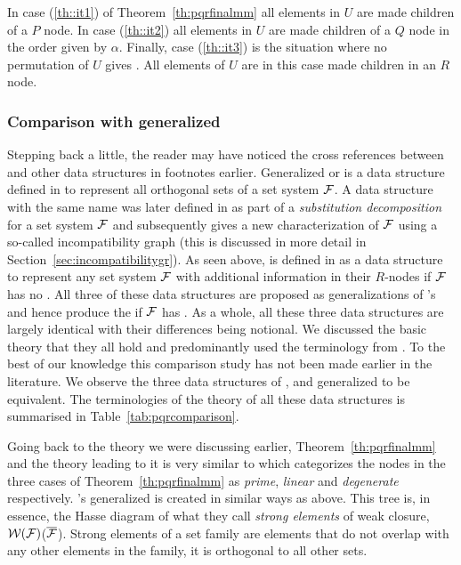In case (\ref{th::it1}) of Theorem~\ref{th:pqrfinalmm} all elements in
$U$ are made children of a $P$ node. In case (\ref{th::it2}) all
elements in $U$ are made children of a $Q$ node in the order given by
$\alpha$. Finally, case (\ref{th::it3}) is the situation where no permutation
of $U$ gives \COP. All elements of $U$ are in this case made children
in an $R$ node.

\subsubsection{Comparison with generalized \PQtree}

Stepping back a little, the reader may have noticed the cross
references between \PQRtree and other data structures in footnotes
earlier.  Generalized \PQtree or \gPQtree is a data structure defined
in \cite{n89} to represent all orthogonal sets of a set system
${\cal F}$. A data structure with the same name was later defined in
\cite{mcc04} as part of a {\em substitution decomposition} for a set
system ${\cal F}$ and subsequently \cite{mcc04} gives a new
characterization of ${\cal F}$ using a so-called incompatibility graph
(this is discussed in more detail in
Section~\ref{sec:incompatibilitygr}). As seen above, \PQRtree is
defined in \cite{mm96} as a data structure to represent any set system
${\cal F}$ with additional information in their $R$-nodes if ${\cal F}$ has no
\COP. All three of these data structures are proposed as
generalizations of \cite{bl76}'s \PQtree and hence produce the \PQtree
if ${\cal F}$ has \COP. As a whole, all these three data structures are
largely identical with their differences being notional. We discussed
the basic theory that they all hold and predominantly used the
terminology from \cite{mm96}. To the best of our knowledge this
comparison study has not been made earlier in the literature.  We
observe the three data structures of \PQRtree, \gPQtree and generalized
\PQtree to be equivalent. The terminologies of the theory of all these
data structures is summarised in Table~\ref{tab:pqrcomparison}.

Going back to the theory we were discussing earlier,
Theorem~\ref{th:pqrfinalmm} and the theory leading to it is very
similar to \cite[esp. Th.~2.1, 3.5. also Th.~3.2, 3.3, 3.4]{mcc04}
which categorizes the nodes in the three cases of
Theorem~\ref{th:pqrfinalmm} as {\em prime}, {\em linear} and {\em
  degenerate} respectively. \cite{mcc04}'s generalized \PQtree is
created in similar ways as \PQRtree above. This tree is, in essence,
the Hasse diagram of what they call {\em strong elements} of weak
closure, ${\cal W}({\cal F})$(\ie $\overline{{\cal F}}$). Strong elements of a set
family are elements that do not overlap with any other elements in the
family, \ie it is orthogonal to all other sets\cite[Def.~3.3]{mcc04}.

